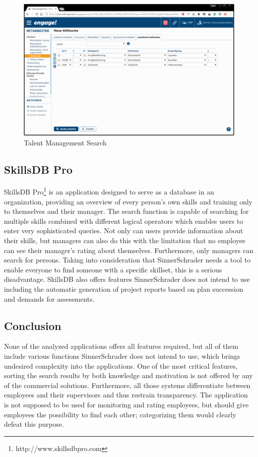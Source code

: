 \begin{figure}[!htp]
    \centering
    \includegraphics[width=\textwidth]{images/talent_management_-_skillmanagement_-_skillsuche.png}
    \caption[Screenshot: Talent Management Search]{Talent Management Search}
    \label{fig:talent_management}
\end{figure}

\subsection{SkillsDB Pro}
SkillsDB Pro\footnote{http://www.skillsdbpro.com} is an application designed to serve as a database in an organization, providing an overview of every person’s own skills and training only to themselves and their manager. The search function is capable of searching for multiple skills combined with different logical operators which enables users to enter very sophisticated queries.
Not only can users provide information about their skills, but managers can also do this with the limitation that no employee can see their manager’s rating about themselves.
Furthermore, only managers can search for persons. Taking into consideration that SinnerSchrader needs a tool to enable everyone to find someone with a specific skillset, this is a serious disadvantage.
SkillsDB also offers features SinnerSchrader does not intend to use including the automatic generation of project reports based on plan succession and demands for assessments.

\newpage

\subsection{Conclusion}
None of the analyzed applications offers all features required, but all of them include various functions SinnerSchrader does not intend to use, which brings undesired complexity into the applications.
One of the most critical features, sorting the search results by both knowledge and motivation is not offered by any of the commercial solutions.
Furthermore, all those systems differentiate between employees and their supervisors and thus restrain transparency. The application is not supposed to be used for monitoring and rating employees, but should give employees the possibility to find each other; categorizing them would clearly defeat this purpose.

